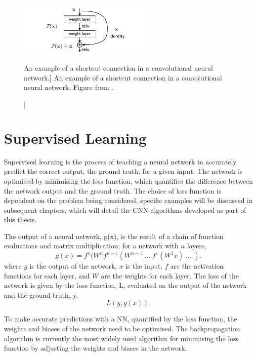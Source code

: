 \begin{figure}

	\centering

	\includegraphics[width = 0.6\textwidth]{figures/short_connect.pdf}

	\caption
	[An example of a shortcut connection in a convolutional neural network.]
	{ An example of a shortcut connection in a convolutional neural network.
	Figure from \cite{He_2016_CVPR}.}

	\label{fig:short_connect}

\end{figure}

\section{Supervised Learning}
Supervised learning is the process of teaching a neural network to accurately
predict the correct output, the ground truth, for a given input. The network is 
optimised by minimising the loss function, which quantifies the difference 
between the network output and the ground truth. The choice of loss function 
is dependent on the problem being considered, specific examples will be 
discussed in subsequent chapters, which will detail the CNN algorithms 
developed as part of this thesis.

The output of a neural network, g(x), is the result of a chain of function 
evaluations and matrix multiplication; for a network with $n$ layers,
\begin{equation*}
	g(x) = f^n(W^n f^{n-1}(W^{n-1} \;...\; f^1(W^1 x) \;...\; ).
\end{equation*}
where $g$ is the output of the network, $x$ is the input, $f$ are the 
activation functions for each layer, and $W$ are the weights for each layer. 
The loss of the network is given by the loss function, L,  evaluated on the 
output of the network and the ground truth, y,
\begin{equation*}
	L(y, g(x)).
\end{equation*}

To make accurate predictions with a NN, quantified by the loss function, the
weights and biases of the network need to be optimised. The backpropagation
algorithm\cite{Rumelhart1986} is currently the most widely used algorithm for
minimising the loss function by adjusting the weights and biases in the network.

